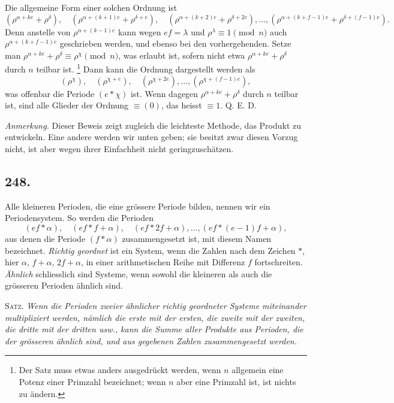\documentclass[12pt]{article}
\begin{document}
Die allgemeine Form einer solchen Ordnung ist
\[
(\rho^{\alpha+ke}+\rho^\delta),\quad (\rho^{\alpha+(k+1)e}+\rho^{\delta+e}),\quad (\rho^{\alpha+(k+2)e}+\rho^{\delta+2e}),\ldots, (\rho^{\alpha+(k+f-1)e}+\rho^{\delta+(f-1)e}).
\]
Denn anstelle von $\rho^{\alpha+(k-1)e}$ kann wegen $ef=\lambda$ und $\rho^\lambda\equiv 1\pmod n$ auch $\rho^{\alpha+(k+f-1)e}$ geschrieben werden, und ebenso bei den vorhergehenden. Setze man $\rho^{\alpha+ke}+\rho^\delta\equiv \rho^\chi\pmod n$, was erlaubt ist, sofern nicht etwa $\rho^{\alpha+ke}+\rho^\delta$ durch $n$ teilbar ist.
\footnote{Der Satz muss etwas anders ausgedrückt werden, wenn $n$ allgemein eine Potenz einer Primzahl bezeichnet; wenn $n$ aber eine Primzahl ist, ist nichts zu ändern.}
Dann kann die Ordnung dargestellt werden als
\[
(\rho^\chi),\quad (\rho^{\chi+e}),\quad (\rho^{\chi+2e}),\ldots,(\rho^{\chi+(f-1)e}),
\]
was offenbar die Periode $(e*\chi)$ ist. Wenn dagegen $\rho^{\alpha+ke}+\rho^\delta$ durch $n$ teilbar ist, sind alle Glieder der Ordnung $\equiv(0)$, das heisst $\equiv 1$. Q. E. D.

\textit{Anmerkung.} Dieser Beweis zeigt zugleich die leichteste Methode, das Produkt zu entwickeln. Eine andere werden wir unten geben; sie besitzt zwar diesen Vorzug nicht, ist aber wegen ihrer Einfachheit nicht geringzuschätzen.

\subsection*{248.}
Alle kleineren Perioden, die eine grössere Periode bilden, nennen wir ein Periodensystem. So werden die Perioden
\[
(ef*\alpha),\quad (ef*f+\alpha),\quad (ef*2f+\alpha),\ldots,(ef*(e-1)f+\alpha),
\]
aus denen die Periode $(f*\alpha)$ zusammengesetzt ist, mit diesem Namen bezeichnet. \textit{Richtig geordnet} ist ein System, wenn die Zahlen nach dem Zeichen $*$, hier $\alpha$, $f+\alpha$, $2f+\alpha$, in einer arithmetischen Reihe mit Differenz $f$ fortschreiten. \textit{Ähnlich} schliesslich sind Systeme, wenn sowohl die kleineren als auch die grösseren Perioden ähnlich sind.

\textsc{Satz.} \textit{Wenn die Perioden zweier ähnlicher richtig geordneter Systeme miteinander multipliziert werden, nämlich die erste mit der ersten, die zweite mit der zweiten, die dritte mit der dritten usw., kann die Summe aller Produkte aus Perioden, die der grösseren ähnlich sind, und aus gegebenen Zahlen zusammengesetzt werden.}
\end{document}
